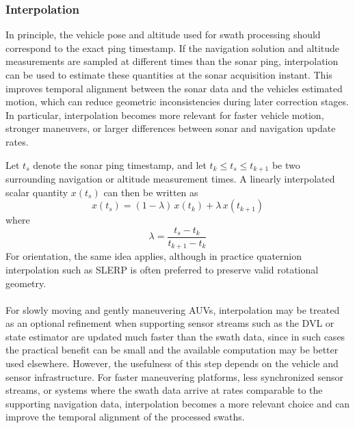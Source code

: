 \subsubsection{Interpolation}
In principle, the vehicle pose and altitude used for swath processing should correspond to the exact ping timestamp. If the navigation solution and altitude measurements are sampled at different times than the sonar ping, interpolation can be used to estimate these quantities at the sonar acquisition instant. This improves temporal alignment between the sonar data and the vehicles estimated motion, which can reduce geometric inconsistencies during later correction stages. In particular, interpolation becomes more relevant for faster vehicle motion, stronger maneuvers, or larger differences between sonar and navigation update rates.

\newpage

\noindent
Let $t_s$ denote the sonar ping timestamp, and let $t_k \leq t_s \leq t_{k+1}$ be two surrounding navigation or altitude measurement times. A linearly interpolated scalar quantity $x(t_s)$ can then be written as
$$
    x(t_s) = (1-\lambda)\,x(t_k) + \lambda\,x(t_{k+1})
$$
where
$$
    \lambda = \frac{t_s - t_k}{t_{k+1} - t_k}
$$
For orientation, the same idea applies, although in practice quaternion interpolation such as SLERP is often preferred to preserve valid rotational geometry.  
\\ \\
For slowly moving and gently maneuvering AUVs, interpolation may be treated as an optional refinement when supporting sensor streams such as the DVL or state estimator are updated much faster than the swath data, since in such cases the practical benefit can be small and the available computation may be better used elsewhere. However, the usefulness of this step depends on the vehicle and sensor infrastructure. For faster maneuvering platforms, less synchronized sensor streams, or systems where the swath data arrive at rates comparable to the supporting navigation data, interpolation becomes a more relevant choice and can improve the temporal alignment of the processed swaths.



